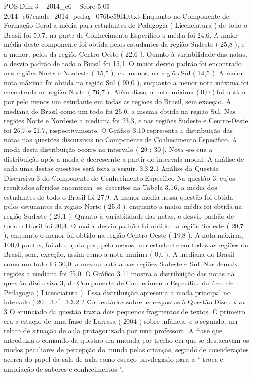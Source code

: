 \begin{textsample}{POS Dim 3 – 2014\_c6 – Score 5.00 – 2014\_c6/enade\_2014\_pedag\_076bc59f40.txt}
Enquanto no Componente de Formação Geral a média para estudantes de Pedagogia ( Licenciatura ) de todo o Brasil foi 50,7, na parte de Conhecimento Específico a média foi 24,6.
A maior média deste componente foi obtida pelos estudantes da região Sudeste ( 25,8 ), e a menor, pelos da região Centro-Oeste ( 22,6 ).
Quanto à variabilidade das notas, o desvio padrão de todo o Brasil foi 15,1.
O maior desvio padrão foi encontrado nas regiões Norte e Nordeste ( 15,5 ), e o menor, na região Sul ( 14,5 ).
A maior nota máxima foi obtida na região Sul ( 90,0 ), enquanto a menor nota máxima foi encontrada na região Norte ( 76,7 ).
Além disso, a nota mínima ( 0,0 ) foi obtida por pelo menos um estudante em todas as regiões do Brasil, sem exceção.
A mediana do Brasil como um todo foi 25,0, a mesma obtida na região Sul.
Nas regiões Norte e Nordeste a mediana foi 23,3, e nas regiões Sudeste e Centro-Oeste foi 26,7 e 21,7, respectivamente.
O Gráfico 3.10 representa a distribuição das notas nas questões discursivas no Componente de Conhecimento Específico.
A moda desta distribuição ocorre no intervalo ( 20 ; 30 ].
Nota -se que a distribuição após a moda é decrescente a partir do intervalo modal.
A análise de cada uma destas questões será feita a seguir. 3.3.2.1 Análise da Questão Discursiva 3 do Componente de Conhecimento Específico Na questão 3, cujos resultados aferidos encontram -se descritos na Tabela 3.16, a média dos estudantes de todo o Brasil foi 27,9.
A menor média nessa questão foi obtida pelos estudantes da região Norte ( 25,3 ), enquanto a maior média foi obtida na região Sudeste ( 29,1 ).
Quanto à variabilidade das notas, o desvio padrão de todo o Brasil foi 20,4.
O maior desvio padrão foi obtido na região Sudeste ( 20,7 ), enquanto o menor foi obtido na região Centro-Oeste ( 19,8 ).
A nota máxima, 100,0 pontos, foi alcançada por, pelo menos, um estudante em todas as regiões do Brasil, sem, exceção, assim como a nota mínima ( 0,0 ).
A mediana do Brasil como um todo foi 30,0, a mesma obtida nas regiões Sudeste e Sul.
Nas demais regiões a mediana foi 25,0.
O Gráfico 3.11 mostra a distribuição das notas na questão discursiva 3, do Componente de Conhecimento Específico da área de Pedagogia ( Licenciatura ).
Essa distribuição apresenta a moda principal no intervalo ( 20 ; 30 ]. 3.3.2.2 Comentários sobre as respostas à Questão Discursiva 3 O enunciado da questão trazia dois pequenos fragmentos de textos.
O primeiro era a citação de uma frase de Larrosa ( 2004 ) sobre infância, e o segundo, um relato de situação de aula protagonizada por uma professora.
A frase que introduzia o comando da questão era iniciada por trecho em que se destacavam os modos peculiares de percepção do mundo pelas crianças, seguido de considerações acerca do papel da sala de aula como espaço privilegiado para a “ troca e ampliação de saberes e conhecimentos ”.

\end{textsample}

